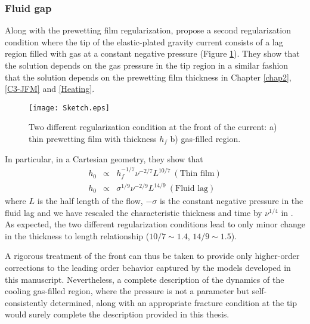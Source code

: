 \subsubsection*{Fluid gap}
\label{sec:fracturation}

Along      with      the     prewetting      film      regularization,
\citet{Anonymous:QWXp_4JV} propose  a second  regularization condition
where the tip of the elastic-plated  gravity current consists of a lag
region  filled  with  gas  at a  constant  negative  pressure  (Figure
\ref{C7-Sketch}).   They show  that the  solution depends  on the  gas
pressure in  the tip  region in  a similar  fashion that  the solution
depends  on  the prewetting  film  thickness  in Chapter  \ref{chap2},
\ref{C3-JFM} and \ref{Heating}.
\begin{figure}[h!]
 \begin{center}
 \graphicspath{ {/Users/thorey/Documents/These/Manuscript/Figure/Chapter7/} }
 \texttt{[image: Sketch.eps]}
 \caption{Two different  regularization condition at the  front of the
   current: a) thin prewetting film with thickness $h_f$ b) gas-filled
   region.}
 \label{C7-Sketch}
 \end{center}
\end{figure}
In particular, in a Cartesian geometry, they show that
\begin{eqnarray}
 h_0&\propto& h_f^{-1/7}\nu^{-2/7}L^{10/7}~(\text{Thin film})\\
 h_0&\propto& \sigma^{1/9}\nu^{-2/9}L^{14/9}~(\text{Fluid lag})
\end{eqnarray}
where $L$  is the half length  of the flow, $-\sigma$  is the constant
negative  pressure  in  the  fluid   lag  and  we  have  rescaled  the
characteristic    thickness    and     time    by    $\nu^{1/4}$    in
\citet{Anonymous:QWXp_4JV}.   As    expected,   the    two   different
regularization conditions lead  to only minor change  in the thickness
to length relationship ($10/7\sim 1.4$, $14/9\sim 1.5 $).

A rigorous  treatment of the front  can thus be taken  to provide only
higher-order corrections to the leading order behavior captured by the
models  developed   in  this  manuscript.  Nevertheless,   a  complete
description of  the dynamics of  the cooling gas-filled  region, where
the  pressure is  not  a parameter  but self-consistently  determined,
along with an  appropriate fracture condition at the  tip would surely
complete the description provided in this thesis.


